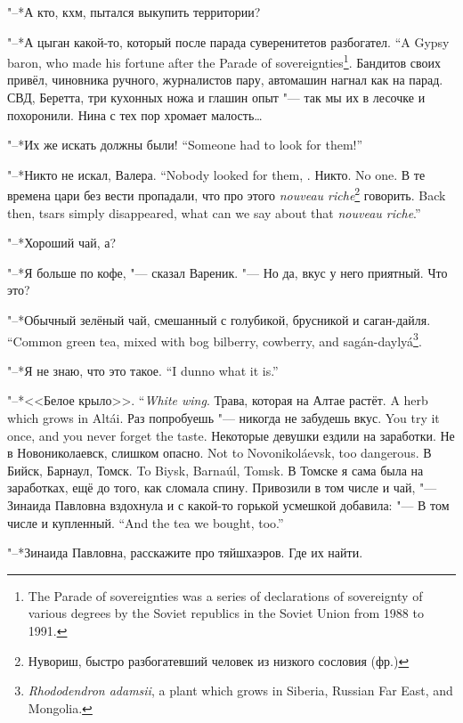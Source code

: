 "--*А кто, кхм, пытался выкупить территории?

{"--*А цыган какой-то, который после парада суверенитетов разбогател.}
{``A Gypsy baron, who made his fortune after the Parade of sovereignties\footnote{The Parade of sovereignties was a series of declarations of sovereignty of various degrees by the Soviet republics in the Soviet Union from 1988 to 1991.}.}
Бандитов своих привёл, чиновника ручного, журналистов пару, автомашин нагнал как на парад.
СВД, Беретта, три кухонных ножа и глашин опыт "--- так мы их в лесочке и похоронили.
Нина с тех пор хромает малость\ldots{}

{"--*Их же искать должны были!}
{``Someone had to look for them!''}

{"--*Никто не искал, Валера.}
{``Nobody looked for them, \Valera.}
{Никто.}
{No one.}
{В те времена цари без вести пропадали, что про этого \textit{nouveau riche}\footnote{Нувориш, быстро разбогатевший человек из низкого сословия (фр.)} говорить.}
{Back then, tsars simply disappeared, what can we say about that \textit{nouveau riche}.''}

\asterism

"--*Хороший чай, а?

"--*Я больше по кофе, "--- сказал Вареник.
"--- Но да, вкус у него приятный.
Что это?

{"--*Обычный зелёный чай, смешанный с голубикой, брусникой и саган-дайля.}
{``Common green tea, mixed with bog bilberry, cowberry, and sag\'an-dayly\'a\footnote{\textit{Rhododendron adamsii}, a plant which grows in Siberia, Russian Far East, and Mongolia.}.}

{"--*Я не знаю, что это такое.}
{``I dunno what it is.''}

{"--*<<Белое крыло>>.}
{``\emph{White wing}.}
{Трава, которая на Алтае растёт.}
{A herb which grows in Alt\'ai.}
{Раз попробуешь "--- никогда не забудешь вкус.}
{You try it once, and you never forget the taste.}
Некоторые девушки ездили на заработки.
{Не в Новониколаевск, слишком опасно.}
{Not to Novonikol\'aevsk, too dangerous.}
{В Бийск, Барнаул, Томск.}
{To Biysk, Barna\'ul, Tomsk.}
В Томске я сама была на заработках, ещё до того, как сломала спину.
Привозили в том числе и чай, "--- Зинаида Павловна вздохнула и с какой-то горькой усмешкой добавила:
{"--- В том числе и купленный.}
{``And the tea we bought, too.''}

"--*Зинаида Павловна, расскажите про тяйшхаэров.
Где их найти.

